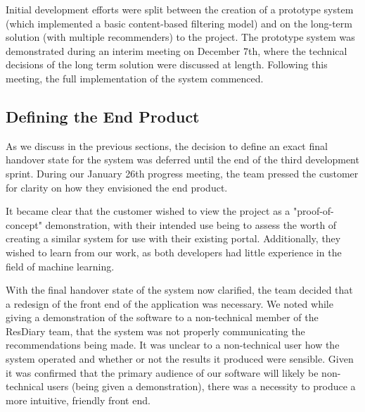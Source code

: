 \documentclass{l3proj}
\begin{document}

Initial development efforts were split between the creation of a prototype system (which implemented a basic content-based filtering model) and on the long-term solution (with multiple recommenders) to the project. The prototype system was demonstrated during an interim meeting on December 7th, where the technical decisions of the long term solution were discussed at length. Following this meeting, the full implementation of the system commenced. 

\subsection{Defining the End Product}
\label{sec:jandefinedstate}

As we discuss in the previous sections, the decision to define an exact final handover state for the system was deferred until the end of the third development sprint. During our January 26th progress meeting, the team pressed the customer for clarity on how they envisioned the end product. 

It became clear that the customer wished to view the project as a "proof-of-concept" demonstration, with their intended use being to assess the worth of creating a similar system for use with their existing portal. Additionally, they wished to learn from our work, as both developers had little experience in the field of machine learning.

With the final handover state of the system now clarified, the team decided that a redesign of the front end of the application was necessary. We noted while giving a demonstration of the software to a non-technical member of the ResDiary team, that the system was not properly communicating the recommendations being made. It was unclear to a non-technical user how the system operated and whether or not the results it produced were sensible. Given it was confirmed that the primary audience of our software will likely be non-technical users (being given a demonstration), there was a necessity to produce a more intuitive, friendly front end. 
\end{document}
